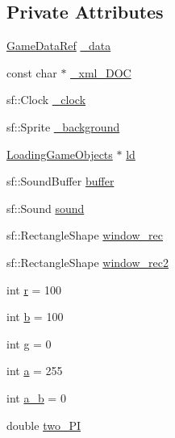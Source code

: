 \subsection*{Private Attributes}
\begin{DoxyCompactItemize}
\item 
\hyperlink{namespaceSekander_a1d69b002ba2d23020901c28f0def5e16}{Game\+Data\+Ref} \hyperlink{classSekander_1_1SplashState_a9b4c437b8381b964f3888a9c34c505b3}{\+\_\+data}
\item 
const char $\ast$ \hyperlink{classSekander_1_1SplashState_a3b2a0dfe9948b7ce7b0090fd3a4d45ae}{\+\_\+xml\+\_\+\+D\+OC}
\item 
sf\+::\+Clock \hyperlink{classSekander_1_1SplashState_a536a6abd6bf7b25b13c643268e0cdc5f}{\+\_\+clock}
\item 
sf\+::\+Sprite \hyperlink{classSekander_1_1SplashState_a138c6168e7a3f910ec07e5358d885d5f}{\+\_\+background}
\item 
\hyperlink{classSekander_1_1LoadingGameObjects}{Loading\+Game\+Objects} $\ast$ \hyperlink{classSekander_1_1SplashState_a52b5e2e5c009568d86b8d04cab0f25eb}{ld}
\item 
sf\+::\+Sound\+Buffer \hyperlink{classSekander_1_1SplashState_ab55b67506296306d1052be850eee455b}{buffer}
\item 
sf\+::\+Sound \hyperlink{classSekander_1_1SplashState_a820828a38fcf1bafada569e889d5a779}{sound}
\item 
sf\+::\+Rectangle\+Shape \hyperlink{classSekander_1_1SplashState_a3522ebb11107475ddb6ab8b787b612b9}{window\+\_\+rec}
\item 
sf\+::\+Rectangle\+Shape \hyperlink{classSekander_1_1SplashState_a1f4bf1010fbec5d0873b465c9e8dec7d}{window\+\_\+rec2}
\item 
int \hyperlink{classSekander_1_1SplashState_a4d7ea7b0bddcdc29d96e08da7e2efbf4}{r} = 100
\item 
int \hyperlink{classSekander_1_1SplashState_aab2a67735fa67169f0359c9d788e6555}{b} = 100
\item 
int \hyperlink{classSekander_1_1SplashState_a20007b0dea253e377162ad99bd0e2c2b}{g} = 0
\item 
int \hyperlink{classSekander_1_1SplashState_a4afa8ff30b6f644d71009aaeacbef7cc}{a} = 255
\item 
int \hyperlink{classSekander_1_1SplashState_a71eb4ebad66f0d6b65d1aaac9dd394df}{a\+\_\+b} = 0
\item 
double \hyperlink{classSekander_1_1SplashState_a412b596a55aa117ae8b2ebc6c39450ec}{two\+\_\+\+PI}
\item 

\end{DoxyCompactItemize}
